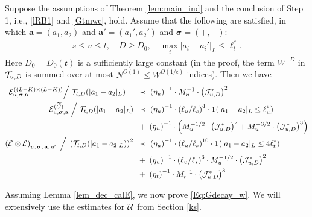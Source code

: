 \begin{lemma}\label{lem_dec_calE}  Suppose  the assumptions of Theorem  \ref{lem:main_ind} and the conclusion  of Step 1, i.e., \eqref{lRB1} and \eqref{Gtmwc}, 
hold. Assume that the following are satisfied, in which $\textbf{a}=(a_{1},a_{2})$ and $\textbf{a}'=(a_{1}',a_{2}')$ and $\boldsymbol{\sigma}=(+,-)$:
\begin{align} 
s\le u\le t, \quad  D\ge D_{0}, \quad 
\max_i |a_i-a_i'|_{L}\le \ell_t ^*. \label{57}
\end{align}
Here $D_{0}=D_{0}(\mathfrak{c})$ is a sufficiently large constant (in the proof, the term $W^{-D}$ in ${\cal T}_{u,D}$ is summed over at most $N^{O(1)}\leq W^{O(1/\mathfrak{c})}$ indices). Then we have
\begin{align}\label{res_deccalE_lk}
       {\cal E}^{( (L-K)\times(L-K) )}
       _{u, \boldsymbol{\sigma},\textbf{a}} \Big/\; 
  {\cal T}_{t,D}(|a_1-a_2|_{L}) \quad 
 \;  &\; \prec \; 
   \left(\eta_u\right)^{-1} 
   \cdot  
   M_{u}^{-1}
    \cdot 
 \left({\cal J}^{*}_{u,D} \right)^{2}
 \\
      \mathcal{E}^{( \widetilde{G} )}_{u, \boldsymbol{\sigma},\textbf{a}} 
    \;\Big/\; 
 {\cal T}_{t,D}(|a_1-a_2|_{L})
 \;  &\; \prec \; 
 \left(\eta_u\right)^{-1} 
  \cdot \left(\ell_u/\ell_s\right)^{4}\cdot{\bf 1}(|a_1-a_2|_{L}\le \ell_u^*)
    \nonumber  \\
       \;  &\; + \;  \left(\eta_u\right)^{-1} 
  \cdot
       \left(M_{u}^{-1/2}  \cdot 
       \left({\cal J}^{*}_{u,D} \right)^{2}+M_{u}^{-3/2}  \cdot 
       \left({\cal J}^{*}_{u,D} \right)^{3}\right)
 \label{res_deccalE_wG}\\
\label{res_deccalE_dif}
    \left(
   \mathcal{E}\otimes  \mathcal{E} \right)
   _{u, \,\boldsymbol{\sigma},  \,{\textbf a} ,\, {\textbf a}'
     }
     \;\Big/\; 
 \left( {\cal T}_{t,D}(|a_1-a_2|_{L})\right)^2
 \;  &\; \prec \; 
  \left(\eta_u\right)^{-1} 
  \cdot \left(\ell_u/\ell_s\right)^{10}\cdot{\bf 1}(|a_1-a_2|_{L}\le 4\ell_t^*)
     \nonumber \\
       \;  &\; + \;  \left(\eta_u\right)^{-1} 
  \cdot\left(\ell_u/\ell_s\right)^{3}\cdot
       M_{u}^{-1/2}  \cdot 
    \left({\cal J}^{*}_{u,D} \right)^{2}
     \nonumber \\
       \;  &\; + \;\left(\eta_t\right)^{-1} 
  \cdot
       M_{t}^{-1}  \cdot 
    \left({\cal J}^{*}_{u,D} \right)^{3}
\end{align} 
  \end{lemma}


Assuming  Lemma \ref{lem_dec_calE}, we now  prove  \eqref{Eq:Gdecay_w}. We will extensively use the estimates for $\cal U$ from Section \ref{ks}. 



